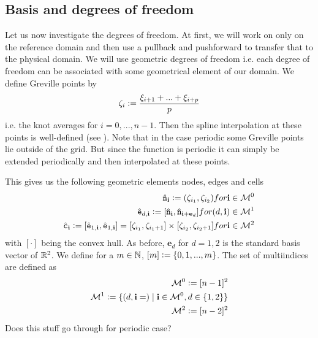 \documentclass[../master_thesis.tex]{subfiles}
\begin{document}
\subsection{Basis and degrees of freedom}

Let us now investigate the degrees of freedom. At first, we will work on only on the 
reference domain and then use a pullback and pushforward to transfer that to the physical domain.
We will use geometric degrees of 
freedom i.e. each degree of freedom can be associated with some geometrical element of our 
domain. We define Greville points by 
\begin{align*}
    \zeta_i \vcentcolon= \frac{\xi_{i+1} + ... + \xi_{i+p}}{p}
\end{align*}
i.e. the knot averages for $i=0,...,n-1$. Then the spline interpolation at these 
points is well-defined (see \cite{I think that was in the isogeometric analysis book}).
Note that in the case periodic some Greville points lie outside of 
the grid. But since the function is periodic it can simply be extended periodically 
and then interpolated at these points. 

This gives us the following geometric elements nodes, edges and cells
\begin{align*}
    \hat{\mathtt{n}}_\mathbf{i} \vcentcolon= (\zeta_{i_1}, \zeta_{i_2}) for \mathbf{i} \in \mathcal{M}^0
    \\ \hat{\mathtt{e}}_{d,\mathbf{i}} 
        \vcentcolon= [\hat{\mathtt{n}}_\mathbf{i}, \hat{\mathtt{n}}_{\mathbf{i} + \mathbf{e}_d}] 
        for (d, \mathbf{i}) \in \mathcal{M}^1
    \\ \hat{\mathtt{c}}_\mathbf{i} \vcentcolon= [\hat{\mathtt{e}}_{1,\mathbf{i}}, \hat{\mathtt{e}}_{1,\mathbf{i}}]
        = [\zeta_{i_1}, \zeta_{i_1+1}] \times [\zeta_{i_2}, \zeta_{i_2+1}] 
        for \mathbf{i} \in \mathcal{M}^2 
\end{align*}
with $[\cdot]$ being the convex hull. As before, $\mathbf{e}_d$ for $d = 1,2$ is the 
standard basis vector of $\mathbb{R}^2$. 
We define for a $m \in \mathbb{N}$, $[m] \vcentcolon= \{ 0, 1, ..., m\}$.
The set of multiindices are defined as
\begin{align*}
    \mathcal{M}^0 \vcentcolon= [n-1]^2
    \\ \mathcal{M}^1 \vcentcolon= \{ (d, \mathbf{i}=) \mid \mathbf{i} \in \mathcal{M}^0, d\in \{1,2\} \}
    \\ \mathcal{M}^2 \vcentcolon= [n-2]^2
\end{align*}
{\color{red} Does this stuff go through for periodic case?}
\end{document}
